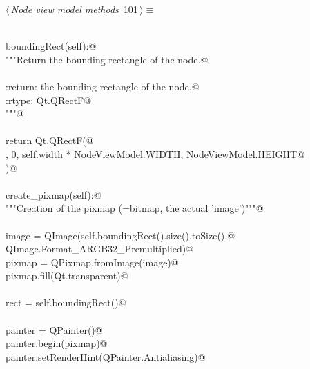 \documentclass[
    a4paper,      %
    10pt,         %
    openright,    %
    notitlepage,  %
    parskip=half, %
]{scrreprt}       %
\theoremstyle{definition}                    %
\begin{document}
\begin{flushleft} \small
\begin{minipage}{\linewidth}\label{scrap163}\raggedright\small
{} $\langle\,${\itshape Node view model methods}\nobreak\ {\footnotesize {101}}$\,\rangle\equiv$
\vspace{-1exm}
\begin{list}{}{} \item
\mbox{}\lstinline@@\\
\mbox{}\lstinline@def boundingRect(self):@\\
\mbox{}\lstinline@    """Return the bounding rectangle of the node.@\\
\mbox{}\lstinline@@\\
\mbox{}\lstinline@    :return: the bounding rectangle of the node.@\\
\mbox{}\lstinline@    :rtype: Qt.QRectF@\\
\mbox{}\lstinline@    """@\\
\mbox{}\lstinline@@\\
\mbox{}\lstinline@    return Qt.QRectF(@\\
\mbox{}, 0, self.width * NodeViewModel.WIDTH, NodeViewModel.HEIGHT@\\
\mbox{}\lstinline@    )@\\
\mbox{}\lstinline@@\\
\mbox{}\lstinline@def create_pixmap(self):@\\
\mbox{}\lstinline@    """Creation of the pixmap (=bitmap, the actual 'image')"""@\\
\mbox{}\lstinline@@\\
\mbox{}\lstinline@    image = QImage(self.boundingRect().size().toSize(),@\\
\mbox{}\lstinline@                    QImage.Format_ARGB32_Premultiplied)@\\
\mbox{}\lstinline@    pixmap = QPixmap.fromImage(image)@\\
\mbox{}\lstinline@    pixmap.fill(Qt.transparent)@\\
\mbox{}\lstinline@@\\
\mbox{}\lstinline@    rect = self.boundingRect()@\\
\mbox{}\lstinline@@\\
\mbox{}\lstinline@    painter = QPainter()@\\
\mbox{}\lstinline@    painter.begin(pixmap)@\\
\mbox{}\lstinline@    painter.setRenderHint(QPainter.Antialiasing)@\\

\end{list}
\end{minipage}
\end{flushleft}
\end{document}
